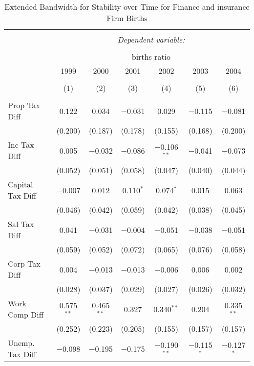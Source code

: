 
\begin{table}[!htbp] \centering 
  \caption{Extended Bandwidth for Stability over Time for  Finance and insurance Firm Births} 
  \label{52 ebyear} 
\small 
\begin{tabular}{@{\extracolsep{5pt}}lcccccc} 
\\[-1.8ex]\hline 
\hline \\[-1.8ex] 
 & \multicolumn{6}{c}{\textit{Dependent variable:}} \\ 
\cline{2-7} 
\\[-1.8ex] & \multicolumn{6}{c}{births ratio} \\ 
 & 1999 & 2000 & 2001 & 2002 & 2003 & 2004 \\ 
\\[-1.8ex] & (1) & (2) & (3) & (4) & (5) & (6)\\ 
\hline \\[-1.8ex] 
 Prop Tax Diff & 0.122 & 0.034 & $-$0.031 & 0.029 & $-$0.115 & $-$0.081 \\ 
  & (0.200) & (0.187) & (0.178) & (0.155) & (0.168) & (0.200) \\ 
  Inc Tax Diff & 0.005 & $-$0.032 & $-$0.086 & $-$0.106$^{**}$ & $-$0.041 & $-$0.073 \\ 
  & (0.052) & (0.051) & (0.058) & (0.047) & (0.040) & (0.044) \\ 
  Capital Tax Diff & $-$0.007 & 0.012 & 0.110$^{*}$ & 0.074$^{*}$ & 0.015 & 0.063 \\ 
  & (0.046) & (0.042) & (0.059) & (0.042) & (0.038) & (0.045) \\ 
  Sal Tax Diff & 0.041 & $-$0.031 & $-$0.004 & $-$0.051 & $-$0.038 & $-$0.051 \\ 
  & (0.059) & (0.052) & (0.072) & (0.065) & (0.076) & (0.058) \\ 
  Corp Tax Diff & 0.004 & $-$0.013 & $-$0.013 & $-$0.006 & 0.006 & 0.002 \\ 
  & (0.028) & (0.037) & (0.029) & (0.027) & (0.026) & (0.032) \\ 
  Work Comp Diff & 0.575$^{**}$ & 0.465$^{**}$ & 0.327 & 0.340$^{**}$ & 0.204 & 0.335$^{**}$ \\ 
  & (0.252) & (0.223) & (0.205) & (0.155) & (0.157) & (0.157) \\ 
  Unemp. Tax Diff & $-$0.098 & $-$0.195 & $-$0.175 & $-$0.190$^{**}$ & $-$0.115$^{*}$ & $-$0.127$^{*}$ \\ 

\end{tabular}
\end{table}
